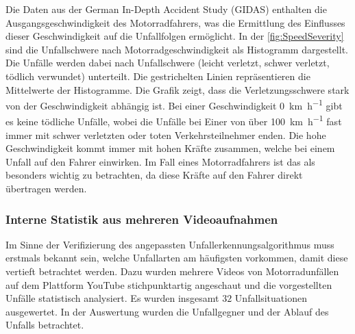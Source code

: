 Die Daten aus der German In-Depth Accident Study (GIDAS) enthalten die Ausgangsgeschwindigkeit des Motorradfahrers, was die Ermittlung des Einflusses dieser Geschwindigkeit auf die Unfallfolgen ermöglicht. In der \autoref{fig:SpeedSeverity} sind die Unfallschwere nach Motorradgeschwindigkeit als Histogramm dargestellt. Die Unfälle werden dabei nach Unfallschwere (leicht verletzt, schwer verletzt, tödlich verwundet) unterteilt. Die gestrichelten Linien repräsentieren die Mittelwerte der Histogramme.
Die Grafik zeigt, dass die Verletzungsschwere stark von der Geschwindigkeit abhängig ist. Bei einer Geschwindigkeit \SI[per-mode = symbol]{0}{\kilo\meter\per\hour} gibt es keine tödliche Unfälle, wobei die Unfälle bei Einer von über \SI[per-mode = symbol]{100}{\kilo\meter\per\hour} fast immer mit schwer verletzten oder toten Verkehrsteilnehmer enden. Die hohe Geschwindigkeit kommt immer mit hohen Kräfte zusammen, welche bei einem Unfall auf den Fahrer einwirken. Im Fall eines Motorradfahrers ist das als besonders wichtig zu betrachten, da diese Kräfte auf den Fahrer direkt übertragen werden. \citep{Maire2020}


%
%
%

\subsubsection{Interne Statistik aus mehreren Videoaufnahmen}



Im Sinne der Verifizierung des angepassten Unfallerkennungsalgorithmus muss erstmals bekannt sein, welche Unfallarten am häu\-figsten vorkommen, damit diese vertieft betrachtet werden. Dazu wurden mehrere Videos von Motorradunfällen auf dem Plattform \glqq YouTube\grqq{} stichpunktartig angeschaut und die vorgestellten Unfälle statistisch analysiert. Es wurden insgesamt $32$ Unfallsituationen ausgewertet. In der Auswertung wurden die Unfallgegner und der Ablauf des Unfalls betrachtet. \citep{YTMotoPassion} %


